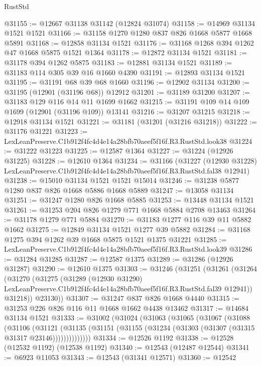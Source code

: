 \begin{lexlean}{RustStd}
\begin{coremodule}
@31155 := @12667 @31138 @31142 (@12824 @31074)
@31158 := @14969 @31134 @1521 @1521
@31166 := @31158 @1270 @1280 @837 @826 @1668 @5877 @1668 @5891
@31168 := @12858 @31134 @1521
@31176 := @31168 @1268 @394 @1262 @47 @1668 @5875 @1521 @1364
@31178 := @12872 @31134 @1521
@31181 := @31178 @394 @1262 @5875
@31183 := @12881 @31134 @1521
@31189 := @31183 @114 @305 @39 @16 @1660 @4390
@31191 := @12893 @31134 @1521
@31195 := @31191 @68 @39 @68 @1660
@31196 := @12902 @31134
@31200 := @31195 (@12901 (@31196 @68)) @12912
@31201 := @31189 @31200
@31207 := @31183 @129 @116 @14 @11 @1699 @1662
@31215 := @31191 @109 @14 @109 @1699 (@12901 (@31196 @109)) @13141
@31216 := @31207 @31215
@31218 := @12918 @31134 @1521
@31221 := @31181 (@31201 (@31216 @31218))
@31222 := @31176 @31221
@31223 := LexLeanPreserve.C1b912f4fc4d4e14a28bfb70aeef5f16f.R3.RustStd.look38
@31224 := @31222 @31223
@31225 := @12587 @1364
@31227 := @31224 (@12926 @31225)
@31228 := @12610 @1364
@31234 := @31166
    (@31227
      (@12930 @31228)
      LexLeanPreserve.C1b912f4fc4d4e14a28bfb70aeef5f16f.R3.RustStd.fal38
      @12941)
@31238 := @15010 @31134 @1521 @1521 @15014
@31246 := @31238 @5877 @1280 @837 @826 @1668 @5886 @1668 @5889
@31247 := @13058 @31134
@31251 := @31247 @1280 @826 @1668 @5885
@31253 := @13448 @31134 @1521
@31261 := @31253 @204 @826 @1279 @771 @1668 @5884 @2708 @13463
@31264 := @31178 @1279 @771 @5884
@31270 := @31183 @1277 @116 @39 @11 @5882 @1662
@31275 := @12849 @31134 @1521 @1277 @39 @5882
@31284 := @31168 @1275 @394 @1262 @39 @1668 @5875 @1521 @1375 @31221
@31285 := LexLeanPreserve.C1b912f4fc4d4e14a28bfb70aeef5f16f.R3.RustStd.look39
@31286 := @31284 @31285
@31287 := @12587 @1375
@31289 := @31286 (@12926 @31287)
@31290 := @12610 @1375
@31303 := @31246
    (@31251
      (@31261
        (@31264
          (@31270
            (@31275
              (@31289
                (@12930 @31290)
                LexLeanPreserve.C1b912f4fc4d4e14a28bfb70aeef5f16f.R3.RustStd.fal39
                @12941))
            @31218))
        @23130))
@31307 := @31247 @837 @826 @1668 @4440
@31315 := @31253 @226 @826 @116 @11 @1668 @1662 @4438 @13462
@31317 := @14684 @31134 @1521
@31333 := @31002
    (@31024
      (@31063
        (@31065
          (@31067
            (@31088
              (@31106
                (@31121
                  (@31135
                    (@31151 (@31155 (@31234 (@31303 (@31307 (@31315 @31317 @23146))))))))))))))
@31334 := @12526 @1192
@31338 := @12528 (@12532 @1192) (@12538 @1192)
@31340 := @12543 (@12487 @12544)
@31341 := @6923 @11053
@31343 := @12543 (@31341 @12571)
@31360 := @12542

\end{coremodule}
\end{lexlean}
